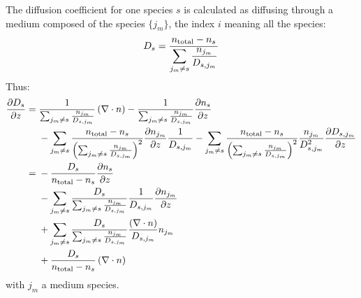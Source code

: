 The diffusion coefficient for one species $s$ is calculated as diffusing through
a medium composed of the species $\{j_m\}$, the index $i$ meaning all the
species:
\begin{equation}
D_s = \frac{n_\text{total} - n_s}{\displaystyle\sum_{j_m \neq s}\frac{n_{j_m}}{D_{s,j_m}}}
\label{Titan:Ds}
\end{equation}
Thus:
\begin{equation}
\begin{split}
\frac{\partial D_s}{\partial z} = &\;   \frac{1}{\sum_{j_m \neq s}\frac{n_{j_m}}{D_{s,j_m}}}\left(\nabla\cdot{\ensuremath{n}}\right) 
                        - \frac{1}{\sum_{j_m \neq s}\frac{n_{j_m}}{D_{s,j_m}}}\frac{\partial n_s}{\partial z} \\
                    &\; - \sum_{j_m\neq s}\frac{n_\text{total} - n_s}{\left(\sum_{j_m \neq s}\frac{n_{j_m}}{D_{s,j_m}}\right)^2}
                                \frac{\partial n_{j_m}}{\partial z}\frac{1}{D_{s,j_m}} 
                        -  \sum_{j_m\neq s}\frac{n_\text{total} - n_s}{\left(\sum_{j_m \neq s}\frac{n_{j_m}}{D_{s,j_m}}\right)^2} 
                                \frac{n_{j_m}}{D_{s,j_m}^2}\frac{\partial D_{s,j_m}}{\partial z}\\
                  = &\; - \frac{D_s}{n_\text{total} - n_s}\frac{\partial n_s}{\partial z} \\
                    &\; - \sum_{j_m\neq s}\frac{D_s}{\sum_{j_m \neq s}\frac{n_{j_m}}{D_{s,j_m}}}
                                \frac{1}{D_{s,j_m}} \frac{\partial n_{j_m}}{\partial z} \\
                    &\; +  \sum_{j_m\neq s}\frac{D_s}{\sum_{j_m \neq s}\frac{n_{j_m}}{D_{s,j_m}}} 
                                \frac{\left(\nabla\cdot{\ensuremath{n}}\right)}{D_{s,j_m}}n_{j_m} \\
                    &\; + \frac{D_s}{n_\text{total} - n_s}\left(\nabla\cdot{\ensuremath{n}}\right) \\
\end{split}
\label{Titan:dDs_dz}
\end{equation}
with $j_m$ a medium species.

